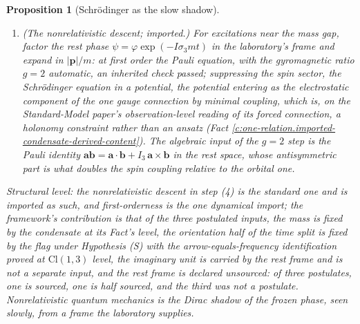 \documentclass[11pt]{article}
\newtheorem{proposition}[theorem]{Proposition}
\theoremstyle{definition}
\theoremstyle{plain}
\providecommand{\Cl}{}\renewcommand{\Cl}{\mathrm{Cl}}
\begin{document}
\begin{proposition}[Schrödinger as the slow shadow]
\begin{enumerate}
\item \emph{(The nonrelativistic descent; imported.)} For excitations near the mass gap, factor the rest phase $\psi = \varphi\exp(-I\sigma_{3}mt)$ in the laboratory's frame and expand in $|\mathbf{p}|/m$: at first order the Pauli equation, with the gyromagnetic ratio $g = 2$ automatic, an inherited check passed; suppressing the spin sector, the Schr\"odinger equation in a potential, the potential entering as the electrostatic component of the one gauge connection by minimal coupling, which is, on the Standard-Model paper's observation-level reading of its forced connection, a holonomy constraint rather than an ansatz (Fact \ref{c:one-relation.imported-condensate-derived-content}). The algebraic input of the $g = 2$ step is the Pauli identity $\mathbf{a}\mathbf{b} = \mathbf{a}\cdot\mathbf{b} + I_{3}\,\mathbf{a}\times\mathbf{b}$ in the rest space, whose antisymmetric part is what doubles the spin coupling relative to the orbital one.
\end{enumerate}
Structural level: the nonrelativistic descent in step (4) is the standard one and is imported as such, and first-orderness is the one dynamical import; the framework's contribution is that of the three postulated inputs, the mass is fixed by the condensate at its Fact's level, the orientation half of the time split is fixed by the flag under Hypothesis (S) with the arrow-equals-frequency identification proved at $\Cl(1,3)$ level, the imaginary unit is carried by the rest frame and is not a separate input, and the rest frame is declared unsourced: of three postulates, one is sourced, one is half sourced, and the third was not a postulate. Nonrelativistic quantum mechanics is the Dirac shadow of the frozen phase, seen slowly, from a frame the laboratory supplies.
\end{proposition}
\end{document}
